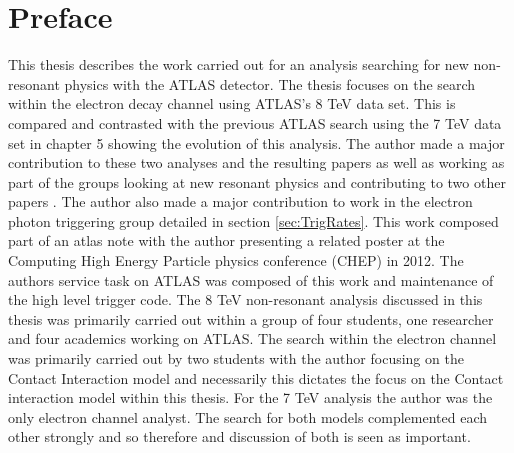 \chapter*{Preface}

This thesis describes the work carried out for an analysis searching for new non-resonant physics with the ATLAS detector. The thesis focuses on the search within the electron decay channel using ATLAS's 8 TeV data set. This is compared and contrasted with the previous ATLAS search using the 7 TeV data set in chapter 5 showing the evolution of this analysis. The author made a major contribution to these two analyses and the resulting papers \cite{PhysRevD.87.015010} as well as working as part of the groups looking at new resonant physics and contributing to two other papers \cite{}. The author also made a major contribution to work in the electron photon triggering group detailed in section \ref{sec:TrigRates}. This work composed part of an atlas note \cite{} with the author presenting a related poster at the Computing High Energy Particle physics conference (CHEP) in 2012. 
The authors service task on ATLAS was composed of this work and maintenance of the high level trigger code.
The 8 TeV non-resonant analysis discussed in this thesis was primarily carried out within a group of four students, one researcher and four academics working on ATLAS. The search within the electron channel was primarily carried out by two students with the author focusing on the Contact Interaction model and necessarily this dictates the focus on the Contact interaction model within this thesis. For the 7 TeV analysis the author was the only electron channel analyst. The search for both models complemented each other strongly and so therefore and discussion of both is seen as important. 









